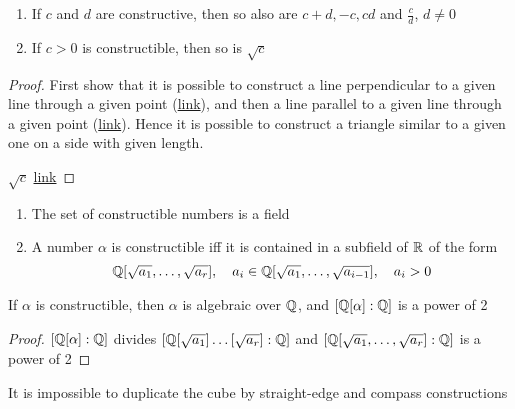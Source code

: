 \documentclass[11pt]{article}
\begin{document}
\begin{lemma}[]
\begin{enumerate}
\item If \(c\) and \(d\) are constructive, then so also are \(c+d,-c,cd\)
and \(\frac{c}{d}\), \(d\neq 0\)
\item If \(c>0\) is constructible, then so is \(\sqrt{c}\)
\end{enumerate}
\end{lemma}

\begin{proof}
First show that it is possible to construct a line perpendicular to a given line through a given
point (\href{https://qb.zuoyebang.com/xfe-question/question/ccd48609d90b8dd2e9aef5b5abaf3fe2.html}{link}), and then a line parallel to a given line through a given point (\href{https://zhidao.baidu.com/question/239781112?from=\&ssid=\&uid=bd\_1458321853\_37\&pu=sz\%40224\_240\%2Cos\%40\&fr=solved\&step=22\&bd\_page\_type=1\&init=middle}{link}). Hence it is
possible to construct a triangle similar to a given one on a side with given length.


\(\sqrt{c}\) \href{https://zhidao.baidu.com/question/553468349.html}{link}
\end{proof}

\begin{theorem}[]
\begin{enumerate}
\item The set of constructible numbers is a field
\item A number \(\alpha\) is constructible iff it is contained in a subfield of \(\mathbb{R}\) of the form
\begin{equation*}
\mathbb{Q}[\sqrt{a_1},\dots,\sqrt{a_r}],\quad a_i\in\mathbb{Q}[\sqrt{a_1},\dots,\sqrt{a_{i-1}}],\quad a_i>0
\end{equation*}
\end{enumerate}
\end{theorem}

\begin{corollary}[]
If \(\alpha\) is constructible, then \(\alpha\) is algebraic over \(\mathbb{Q}\), and \([\mathbb{Q}[\alpha]:\mathbb{Q}]\) is a power of 2
\end{corollary}

\begin{proof}
\([\mathbb{Q}[\alpha]:\mathbb{Q}]\) divides \([\mathbb{Q}[\sqrt{a_1}]\dots[\sqrt{a_r}]:\mathbb{Q}]\) and \([\mathbb{Q}[\sqrt{a_1},\dots,\sqrt{a_r}]:\mathbb{Q}]\) is a
power of 2
\end{proof}

\begin{corollary}[]
It is impossible to duplicate the cube by straight-edge and compass constructions
\end{corollary}
\end{document}
